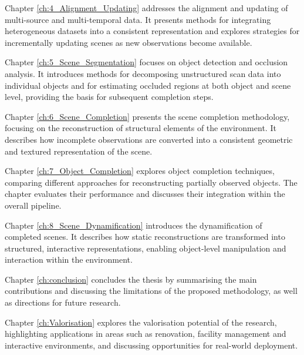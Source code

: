 Chapter \ref{ch:4_Alignment_Updating} addresses the alignment and updating of multi-source and multi-temporal data. It presents methods for integrating heterogeneous datasets into a consistent representation and explores strategies for incrementally updating scenes as new observations become available.

Chapter \ref{ch:5_Scene_Segmentation} focuses on object detection and occlusion analysis. It introduces methods for decomposing unstructured scan data into individual objects and for estimating occluded regions at both object and scene level, providing the basis for subsequent completion steps.

Chapter \ref{ch:6_Scene_Completion} presents the scene completion methodology, focusing on the reconstruction of structural elements of the environment. It describes how incomplete observations are converted into a consistent geometric and textured representation of the scene.

Chapter \ref{ch:7_Object_Completion} explores object completion techniques, comparing different approaches for reconstructing partially observed objects. The chapter evaluates their performance and discusses their integration within the overall pipeline.

Chapter \ref{ch:8_Scene_Dynamification} introduces the dynamification of completed scenes. It describes how static reconstructions are transformed into structured, interactive representations, enabling object-level manipulation and interaction within the environment.

Chapter \ref{ch:conclusion} concludes the thesis by summarising the main contributions and discussing the limitations of the proposed methodology, as well as directions for future research.

Chapter \ref{ch:Valorisation} explores the valorisation potential of the research, highlighting applications in areas such as renovation, facility management and interactive environments, and discussing opportunities for real-world deployment.


\cleardoublepage
